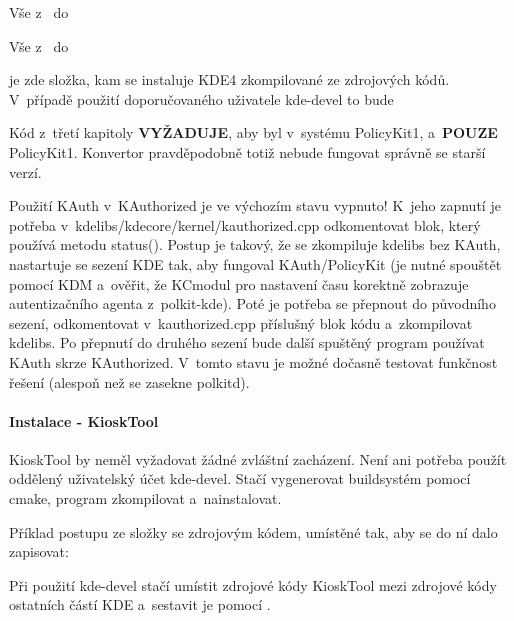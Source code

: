 \noindent
Vše z~ do 

\noindent
Vše z~ do 

\noindent
{} je zde složka, kam se instaluje KDE4 zkompilované ze zdrojových kódů. V~případě použití doporučovaného uživatele kde-devel to bude 

Kód z~třetí kapitoly \textbf{VYŽADUJE}, aby byl v~systému PolicyKit1, a~\textbf{POUZE} PolicyKit1. Konvertor pravděpodobně totiž nebude fungovat správně se starší verzí.

Použití KAuth v~KAuthorized je ve výchozím stavu vypnuto! K~jeho zapnutí je potřeba v~kdelibs/kdecore/kernel/kauthorized.cpp odkomentovat blok, který používá metodu status(). Postup je takový, že se zkompiluje kdelibs bez KAuth, nastartuje se sezení KDE tak, aby fungoval KAuth/PolicyKit (je nutné spouštět pomocí KDM a~ověřit, že KCmodul pro nastavení času korektně zobrazuje autentizačního agenta z~polkit-kde). Poté je potřeba se přepnout do původního sezení, odkomentovat v~kauthorized.cpp příslušný blok kódu a~zkompilovat kdelibs. Po přepnutí do druhého sezení bude další spuštěný program používat KAuth skrze KAuthorized. V~tomto stavu je možné dočasně testovat funkčnost řešení (alespoň než se zasekne polkitd).

\paragraph{Instalace - KioskTool}
KioskTool by neměl vyžadovat žádné zvláštní zacházení. Není ani potřeba použít oddělený uživatelský účet kde-devel. Stačí vygenerovat buildsystém pomocí cmake, program zkompilovat a~nainstalovat.

Příklad postupu ze složky se zdrojovým kódem, umístěné tak, aby se do ní dalo zapisovat:

\noindent
{}

\noindent
{}

\noindent
{}

\noindent
{}

Při použití kde-devel stačí umístit zdrojové kódy KioskTool mezi zdrojové kódy ostatních částí KDE a~sestavit je pomocí .
